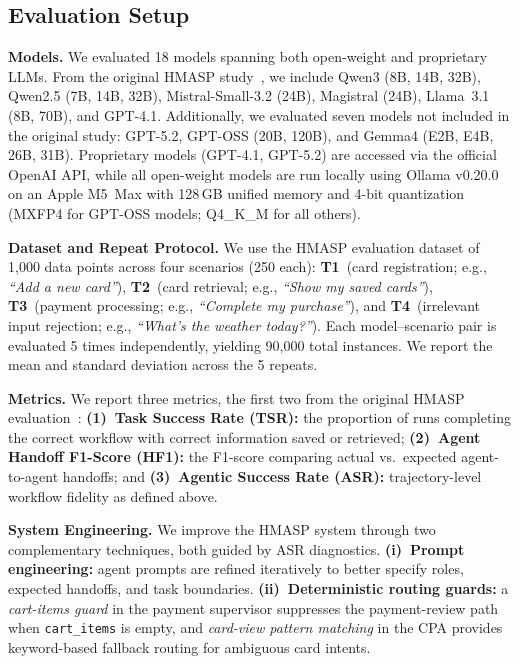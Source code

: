 \documentclass[runningheads]{llncs}
\begin{document}
\subsection{Evaluation Setup}


\noindent\textbf{Models.}
We evaluated 18 models spanning both open-weight and proprietary LLMs. From the original HMASP study~\cite{chua2025hmasp}, we include Qwen3 (8B, 14B, 32B), Qwen2.5 (7B, 14B, 32B), Mistral-Small-3.2 (24B), Magistral (24B), Llama~3.1 (8B, 70B), and GPT-4.1. Additionally, we evaluated seven models not included in the original study: GPT-5.2, GPT-OSS (20B, 120B), and Gemma4 (E2B, E4B, 26B, 31B). Proprietary models (GPT-4.1, GPT-5.2) are accessed via the official OpenAI API, while all open-weight models are run locally using Ollama v0.20.0 on an Apple M5~Max with 128\,GB unified memory and 4-bit quantization (MXFP4 for GPT-OSS models; Q4\_K\_M for all others).

\noindent\textbf{Dataset and Repeat Protocol.}
We use the HMASP evaluation dataset of 1{,}000 data points across four scenarios (250 each): \textbf{T1}~(card registration; e.g., \textit{``Add a new card''}), \textbf{T2}~(card retrieval; e.g., \textit{``Show my saved cards''}), \textbf{T3}~(payment processing; e.g., \textit{``Complete my purchase''}), and \textbf{T4}~(irrelevant input rejection; e.g., \textit{``What's the weather today?''}). Each model--scenario pair is evaluated 5 times independently, yielding 90{,}000 total instances. We report the mean and standard deviation across the 5 repeats.

\noindent\textbf{Metrics.}
We report three metrics, the first two from the original HMASP evaluation~\cite{chua2025hmasp}: \textbf{(1)~Task Success Rate (TSR):} the proportion of runs completing the correct workflow with correct information saved or retrieved; \textbf{(2)~Agent Handoff F1-Score (HF1):} the F1-score comparing actual vs.\ expected agent-to-agent handoffs; and \textbf{(3)~Agentic Success Rate (ASR):} trajectory-level workflow fidelity as defined above.

\noindent\textbf{System Engineering.}
We improve the HMASP system through two complementary techniques, both guided by ASR diagnostics. \textbf{(i)~Prompt engineering:} agent prompts are refined iteratively to better specify roles, expected handoffs, and task boundaries. \textbf{(ii)~Deterministic routing guards:} a \textit{cart-items guard} in the payment supervisor suppresses the payment-review path when \texttt{cart\_items} is empty, and \textit{card-view pattern matching} in the CPA provides keyword-based fallback routing for ambiguous card intents.
\end{document}
